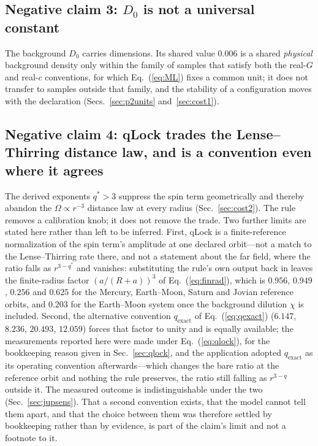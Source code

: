 \documentclass[aps,reprint,amsmath,amssymb,nofootinbib,superscriptaddress,floatfix]{revtex4-2}
\begin{document}
\subsection{Negative claim 3: \texorpdfstring{$D_0$}{D0} is not a
  universal constant}
The background $D_0$ carries dimensions.
Its shared value $0.006$ is a shared \emph{physical} background density
only within the family of samples that satisfy both the real-$G$ and
real-$c$ conventions, for which Eq.~(\ref{eq:ML}) fixes a common unit;
it does not transfer to samples outside that family, and the stability
of a configuration moves with the declaration
(Secs.~\ref{sec:p2units} and~\ref{sec:cost1}).

\subsection{Negative claim 4: qLock trades the Lense--Thirring
  distance law, and is a convention even where it agrees}
The derived exponents $q^{*}>3$ suppress the spin term geometrically
and thereby abandon the $\Omega\propto r^{-3}$ distance law at every
radius (Sec.~\ref{sec:cost2}).
The rule removes a calibration knob; it does not remove the trade.
Two further limits are stated here rather than left to be inferred.
First, qLock is a finite-reference normalization of the spin term's
amplitude at one declared orbit---not a match to the Lense--Thirring
rate there, and not a statement about the far field, where the ratio
falls as $r^{3-q^{*}}$ and vanishes: substituting the rule's own output
back in leaves
the finite-radius factor $(a/(R+a))^{3}$ of Eq.~(\ref{eq:finrad}),
which is $0.956$, $0.949$, $0.256$ and $0.625$ for the Mercury,
Earth--Moon, Saturn and Jovian reference orbits, and $0.203$ for the
Earth--Moon system once the background dilution $\chi$ is included.
Second, the alternative convention $q_{\mathrm{exact}}$ of
Eq.~(\ref{eq:qexact}) ($6.147$, $8.236$, $20.493$, $12.059$) forces
that factor to unity and is equally available; the measurements
reported here were made under Eq.~(\ref{eq:qlock}), for the bookkeeping
reason given in Sec.~\ref{sec:qlock}, and the application adopted
$q_{\mathrm{exact}}$ as its operating convention afterwards---which
changes the bare ratio at the reference orbit and nothing the rule
preserves, the ratio still falling as $r^{3-q}$ outside it.
The measured outcome is indistinguishable under the two
(Sec.~\ref{sec:jupsens}).
That a second convention exists, that the model cannot tell them apart,
and that the choice between them was therefore settled by bookkeeping
rather than by evidence, is part of the claim's limit and not a
footnote to it.
\end{document}
